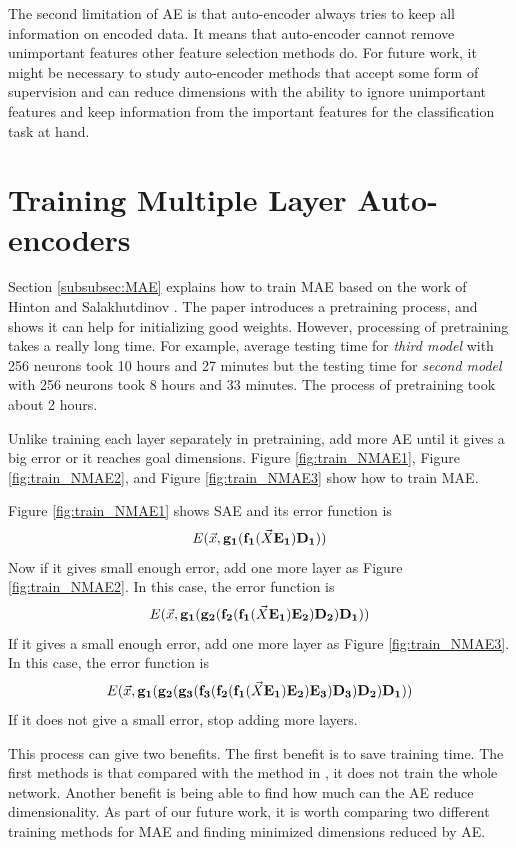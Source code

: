 \documentclass[draft,dvipsnames]{drexel-thesis}
\begin{document}
\begin{thesis}
The second limitation of AE is that auto-encoder always tries to keep all information on encoded data. It means that auto-encoder cannot remove unimportant features other feature selection methods do. %
For future work, it might be necessary to study auto-encoder methods that accept some form of supervision and can reduce dimensions with the ability to ignore unimportant features and keep information from the important features for the classification task at hand.

\section{Training Multiple Layer Auto-encoders}
Section \ref{subsubsec:MAE} explains how to train MAE based on the work of Hinton and Salakhutdinov \cite{hinton2006reducing}. The paper introduces a pretraining process, and shows it can help for initializing good weights. However, processing of pretraining takes a really long time. For example, average testing time for {\em third model} with 256 neurons took 10 hours and 27 minutes but the testing time for {\em second model} with 256 neurons took 8 hours and 33 minutes. The process of pretraining took about 2 hours.

Unlike training each layer separately in pretraining, add more AE until it gives a big error or it reaches goal dimensions. Figure \ref{fig:train_NMAE1}, Figure \ref{fig:train_NMAE2}, and Figure \ref{fig:train_NMAE3} show how to train MAE.

	Figure \ref{fig:train_NMAE1} shows SAE and its error function is
$$E(\vec{x}, \bold{g_1}(\bold{f_1}(\vec{X}\bold{E_1})\bold{D_1}))$$
Now if it gives small enough error, add one more layer as Figure \ref{fig:train_NMAE2}. In this case, the error function is
$$E(\vec{x}, \bold{g_1}(\bold{g_2}(\bold{f_2}(\bold{f_1}(\vec{X}\bold{E_1})\bold{E_2})\bold{D_2})\bold{D_1}))$$
If it gives a small enough error, add one more layer as Figure \ref{fig:train_NMAE3}. In this case, the error function is
$$E(\vec{x}, \bold{g_1}(\bold{g_2}(\bold{g_3}(\bold{f_3}(\bold{f_2}(\bold{f_1}(\vec{X}\bold{E_1})\bold{E_2})\bold{E_3})\bold{D_3})\bold{D_2})\bold{D_1}))$$
If it does not give a small error, stop adding more layers.

This process can give two benefits. The first benefit is to save training time. The first methods is that compared with the method in \cite{hinton2006reducing}, it does not train the whole network. Another benefit is being able to find how much can the AE reduce dimensionality. As part of our future work, it is worth comparing two different training methods for MAE and finding minimized dimensions reduced by AE.


\end{thesis}
\end{document}
